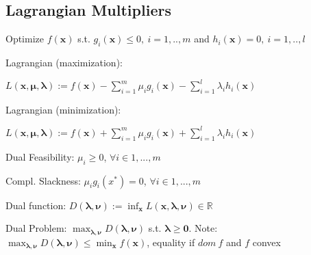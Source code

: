 
\subsection*{Lagrangian Multipliers}
Optimize  $f(\mathbf{x})$ s.t. $g_i(\mathbf{x}) \leq 0,\ i = 1, .., m$ and $h_i(\mathbf{x})=0,\ i = 1, .., l$
\begin{compactdesc}
	\item[Lagrangian (maximization):]
	\item $L(\mathbf{x}, \boldsymbol{\mu}, \boldsymbol{\lambda}) := f(\mathbf{x}) - \sum_{i=1}^m \mu_i g_i(\mathbf{x}) - \sum_{i=1}^l \lambda_i h_i(\mathbf{x})$
	\item[Lagrangian (minimization):]
	\item $L(\mathbf{x}, \boldsymbol{\mu}, \boldsymbol{\lambda}) := f(\mathbf{x}) + \sum_{i=1}^m \mu_i g_i(\mathbf{x}) + \sum_{i=1}^l \lambda_i h_i(\mathbf{x})$
	\item[Dual Feasibility:] $\mu_i \ge 0$, $\forall i \in {1,...,m}$
	\item[Compl. Slackness:] $\mu_i g_i(x^*) = 0$, $\forall i \in {1,...,m}$
	\item[Dual function:] $D(\boldsymbol{\lambda}, \boldsymbol{\nu}) := \inf_{\mathbf{x}} L(\mathbf{x}, \boldsymbol{\lambda}, \boldsymbol{\nu}) \in \mathbb{R}$
	\item[Dual Problem:] $\max_{\boldsymbol{\lambda}, \boldsymbol{\nu}} D(\boldsymbol{\lambda}, \boldsymbol{\nu})$ s.t. $\boldsymbol{\lambda} \geq \mathbf{0}$. Note: $\max_{\boldsymbol{\lambda}, \boldsymbol{\nu}} D(\boldsymbol{\lambda}, \boldsymbol{\nu}) \le \min_\mathbf{x}{f(\mathbf{x})}$, equality if $dom\ f$ and $f$ convex
\end{compactdesc}

